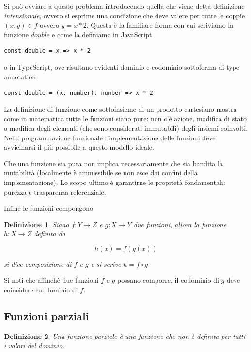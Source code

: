 \documentclass[12pt]{article}
\newtheorem{definition}{Definizione}
\begin{document}
Si può ovviare a questo problema introducendo quella che viene detta definizione \emph{intensionale},
ovvero si esprime una condizione che deve valere per tutte le coppie $(x, y) \in f$ ovvero $y = x * 2$. Questa è la familiare forma con cui scriviamo la funzione $double$ e come la definiamo in JavaScript

\begin{verbatim}
const double = x => x * 2
\end{verbatim}

o in TypeScript, ove risultano evidenti dominio e codominio sottoforma di type annotation

\begin{verbatim}
const double = (x: number): number => x * 2
\end{verbatim}

La definizione di funzione come sottoinsieme di un prodotto cartesiano mostra come in matematica tutte le funzioni siano pure:
non c'è azione, modifica di stato o modifica degli elementi (che sono considerati immutabili) degli insiemi coinvolti.
Nella programmazione funzionale l'implementazione delle funzioni deve avvicinarsi il più possibile a questo modello ideale.

Che una funzione sia pura non implica necessariamente che sia bandita la mutabilità
(localmente è ammissibile se non esce dai confini della implementazione).
Lo scopo ultimo è garantirne le proprietà fondamentali: purezza e trasparenza referenziale.

Infine le funzioni compongono

\begin{definition}
Siano $f: Y \rightarrow Z$ e $g: X \rightarrow Y$ due funzioni, allora la funzione $h: X \rightarrow Z$ definita da

$$
h(x) = f(g(x))
$$

si dice \emph{composizione} di $f$ e $g$ e si scrive $h = f \circ g$

\end{definition}

Si noti che affinchè due funzioni $f$ e $g$ possano comporre, il codominio di $g$ deve coincidere col dominio di $f$.

\subsection{Funzioni parziali}

\begin{definition}
Una funzione \emph{parziale} è una funzione che non è definita per tutti i valori del dominio.
\end{definition}
\end{document}
